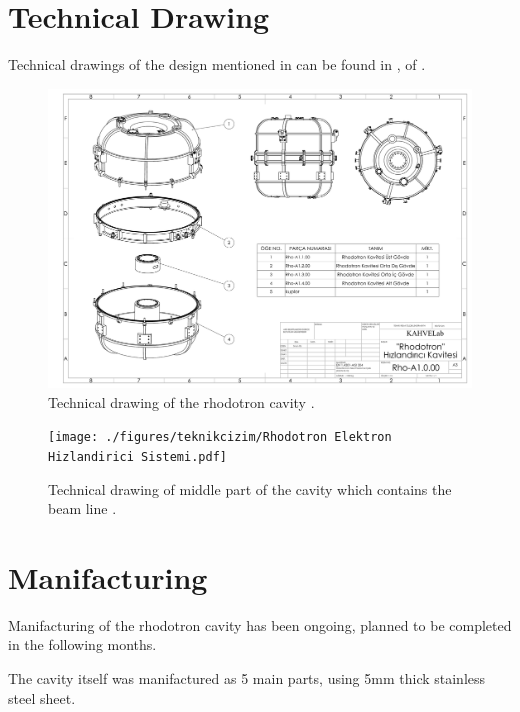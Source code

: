 \documentclass[a4paper,oneside,12pt]{report}
\numberwithin{equation}{chapter}
\begin{document}
\section{Technical Drawing}
Technical drawings of the design mentioned in  can be found in ,  of .

\begin{figure}
    \centering
    \includegraphics[angle=270,origin=c, width=.95\linewidth]{./figures/teknikcizim/Rho-A1.0.00.pdf}
    \vspace{20pt}
    \caption{Technical drawing of the rhodotron cavity \cite{sinan}.}
    \label{fig:techd_rhod}
\end{figure}

\begin{figure}
    \centering
    \texttt{[image: ./figures/teknikcizim/Rhodotron Elektron Hizlandirici Sistemi.pdf]}
    \vspace{20pt}
    \caption{Technical drawing of middle part of the cavity which contains the beam line \cite{sinan}.}
    \label{fig:techd_mid}
\end{figure}

\section{Manifacturing}

Manifacturing of the rhodotron cavity has been ongoing, planned to be completed in the following months.

The cavity itself was manifactured as 5 main parts, using 5mm thick stainless steel sheet. 
\end{document}
